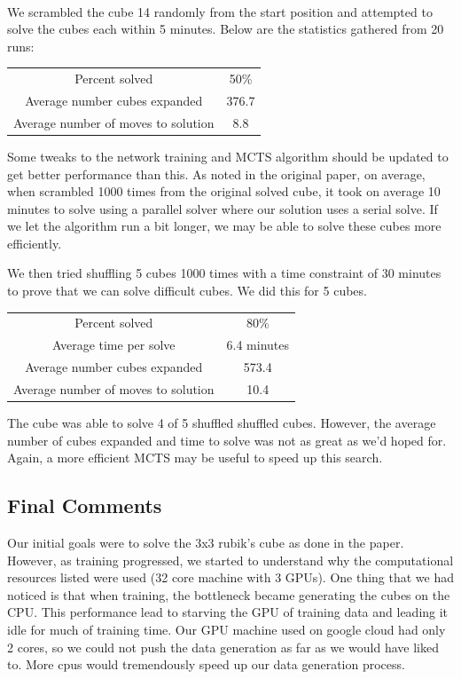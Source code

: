 \documentclass[10pt,twocolumn,letterpaper]{article}
\begin{document}
\

We scrambled the cube 14 randomly from the start position and attempted to solve the cubes each within 5 minutes. Below are the statistics gathered from 20 runs:

\begin{center}
\begin{tabular}{ |c|c| } 
 \hline
 Percent solved & 50\%\\ 
 Average number cubes expanded & 376.7  \\ 
 Average number of moves to solution & 8.8 \\ 
 \hline
\end{tabular}
\end{center}

Some tweaks to the network training and MCTS algorithm should be updated to get better performance than this. As noted in the original paper, on average, when scrambled 1000 times from the original solved cube, it took on average 10 minutes to solve using a parallel solver where our solution uses a serial solve. If we let the algorithm run a bit longer, we may be able to solve these cubes more efficiently. 

We then tried shuffling 5 cubes 1000 times with a time constraint of 30 minutes to prove that we can solve difficult cubes. We did this for 5 cubes.

\begin{center}
\begin{tabular}{ |c|c| } 
 \hline
 Percent solved & 80\%\\ 
 Average time per solve & 6.4 minutes \\
 Average number cubes expanded & 573.4  \\ 
 Average number of moves to solution & 10.4 \\ 
 \hline
\end{tabular}
\end{center}

The cube was able to solve 4 of 5 shuffled shuffled cubes. However, the average number of cubes expanded and time to solve was not as great as we'd hoped for. Again, a more efficient MCTS may be useful to speed up this search.

\subsection{Final Comments}

Our initial goals were to solve the 3x3 rubik's cube as done in the paper. However, as training progressed, we started to understand why the computational resources listed were used (32 core machine with 3 GPUs). One thing that we had noticed is that when training, the bottleneck became generating the cubes on the CPU. This performance lead to starving the GPU of training data and leading it idle for much of training time. Our GPU machine used on google cloud had only 2 cores, so we could not push the data generation as far as we would have liked to. More cpus would tremendously speed up our data generation process.
\end{document}
